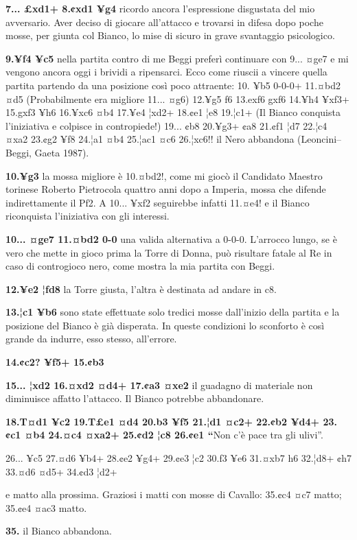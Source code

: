 \textbf{7... £xd1+ 8.¢xd1 ¥g4} ricordo ancora l'espressione disgustata
del mio avversario. Aver deciso di giocare all'attacco e trovarsi in
difesa dopo poche mosse, per giunta col Bianco, lo mise di sicuro in
grave svantaggio psicologico.

\textbf{9.¥f4 ¥c5} nella partita contro di me Beggi preferì continuare
con 9... ¤ge7 e mi vengono ancora oggi i brividi a ripensarci. Ecco come
riuscii a vincere quella partita partendo da una posizione così poco
attraente: 10. ¥b5 0-0-0+ 11.¤bd2 ¤d5 (Probabilmente era migliore 11...
¤g6) 12.¥g5 f6 13.exf6 gxf6 14.¥h4 ¥xf3+ 15.gxf3 ¥h6 16.¥xc6 ¤b4 17.¥e4
¦xd2+ 18.¢e1 ¦e8 19.¦c1+ (Il Bianco conquista l'iniziativa e colpisce in
contropiede!) 19... ¢b8 20.¥g3+ ¢a8 21.¢f1 ¦d7 22.¦c4 ¤xa2 23.¢g2 ¥f8
24.¦a1 ¤b4 25.¦ac1 ¤c6 26.¦xc6!! il Nero abbandona (Leoncini--Beggi,
Gaeta 1987).

\textbf{10.¥g3} la mossa migliore è 10.¤bd2!, come mi giocò il Candidato
Maestro torinese Roberto Pietrocola quattro anni dopo a Imperia, mossa
che difende indirettamente il Pf2. A 10... ¥xf2 seguirebbe infatti
11.¤e4! e il Bianco riconquista l'iniziativa con gli interessi.

\textbf{10... ¤ge7 11.¤bd2 0-0} una valida alternativa a 0-0-0.
L'arrocco lungo, se è vero che mette in gioco prima la Torre di Donna,
può risultare fatale al Re in caso di controgioco nero, come mostra la
mia partita con Beggi.

\textbf{12.¥e2 ¦fd8} la Torre giusta, l'altra è destinata ad andare in
c8.

\textbf{13.¦c1 ¥b6} sono state effettuate solo tredici mosse dall'inizio
della partita e la posizione del Bianco è già disperata. In queste
condizioni lo sconforto è così grande da indurre, esso stesso,
all'errore.

\textbf{14.¢c2? ¥f5+ 15.¢b3}


\textbf{15... ¦xd2 16.¤xd2 ¤d4+ 17.¢a3 ¤xe2} il guadagno di materiale
non diminuisce affatto l'attacco. Il Bianco potrebbe abbandonare.

\textbf{18.T¤d1 ¥c2 19.T£e1 ¤d4 20.b3 ¥f5 21.¦d1 ¤c2+ 22.¢b2 ¥d4+ 23.¢c1
¤b4 24.¤c4 ¤xa2+ 25.¢d2 ¦c8 26.¢e1 ``}Non c'è pace tra gli ulivi''.

26... ¥c5 27.¤d6 ¥b4+ 28.¢e2 ¥g4+ 29.¢e3 ¦c2 30.f3 ¥e6 31.¤xb7 h6
32.¦d8+ ¢h7 33.¤d6 ¤d5+ 34.¢d3 ¦d2+


e matto alla prossima. Graziosi i matti con mosse di Cavallo: 35.¢c4 ¤c7
matto; 35.¢e4 ¤ac3 matto.

\textbf{35.} il Bianco abbandona.

